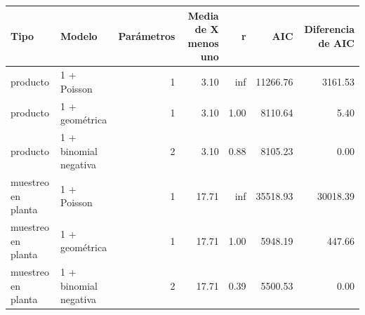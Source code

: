 \begin{tabular}{llrrrrr}
\toprule
Tipo & Modelo & Parámetros & Media de X menos uno & r & AIC & Diferencia de AIC \\
\midrule
producto & 1 + Poisson & 1 & 3.10 & inf & 11266.76 & 3161.53 \\
producto & 1 + geométrica & 1 & 3.10 & 1.00 & 8110.64 & 5.40 \\
producto & 1 + binomial negativa & 2 & 3.10 & 0.88 & 8105.23 & 0.00 \\
muestreo en planta & 1 + Poisson & 1 & 17.71 & inf & 35518.93 & 30018.39 \\
muestreo en planta & 1 + geométrica & 1 & 17.71 & 1.00 & 5948.19 & 447.66 \\
muestreo en planta & 1 + binomial negativa & 2 & 17.71 & 0.39 & 5500.53 & 0.00 \\
\bottomrule
\end{tabular}
